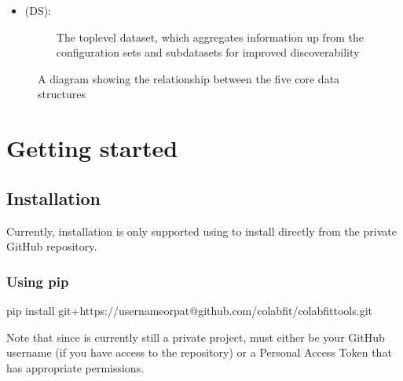 \documentclass[letterpaper,10pt,english]{sphinxmanual}
\begin{document}
\begin{itemize}
\begin{description}
\end{description}

\item {} \begin{description}
\item[{{\hyperref[\detokenize{dataset:colabfit.tools.dataset.Dataset}]{}} (DS):}] \leavevmode
\sphinxAtStartPar
The top\sphinxhyphen{}level dataset, which aggregates information up from the
configuration sets and sub\sphinxhyphen{}datasets for improved discoverability

\end{description}

\end{itemize}

\begin{figure}[htbp]
\centering
\capstart

\noindent{}
\caption{A diagram showing the relationship between the five core data structures}\label{\detokenize{overview:id1}}\end{figure}


\chapter{Getting started}
\label{\detokenize{getting_started:getting-started}}\label{\detokenize{getting_started::doc}}

\section{Installation}
\label{\detokenize{getting_started:installation}}
\sphinxAtStartPar
Currently, installation is only supported using  to install directly
from the private GitHub repository.


\subsection{Using pip}
\label{\detokenize{getting_started:using-pip}}
\begin{sphinxVerbatim}[commandchars=\\\{\}]
pip install git+https://\PYGZlt{}username\PYGZus{}or\PYGZus{}pat\PYGZgt{}@github.com/colabfit/colabfit\PYGZhy{}tools.git
\end{sphinxVerbatim}

\sphinxAtStartPar
Note that since  is currently still a private project,
 must either be your GitHub username (if you have access to the repository) or a
Personal Access Token that has appropriate permissions.
\end{document}
